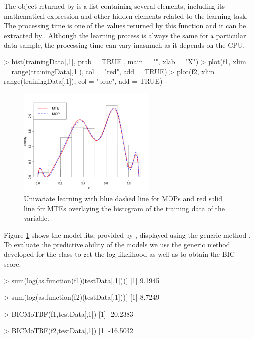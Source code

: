 The object returned by  is a list containing several elements, including its mathematical expression and other hidden elements related to the learning task.
The processing time is one of the values returned by this function and it can be extracted by . 
Although the learning process is always the same for a particular data sample, the processing time can vary inasmuch as it depends on the CPU.

\begin{example}
> hist(trainingData[,1], prob = TRUE , main = "", xlab = "X")
> plot(f1, xlim = range(trainingData[,1]), col = "red", add = TRUE)
> plot(f2, xlim = range(trainingData[,1]), col = "blue", add = TRUE)
\end{example}

\begin{figure}
	\centering

	\includegraphics[width=0.6\textwidth]{FIGS/univariate.png}

	\caption{Univariate learning with blue dashed line for MOPs and red solid line for MTEs overlaying the histogram of the training data of the  variable.}
	\label{fig:univariate}
\end{figure}

Figure \ref{fig:univariate} shows the model fits, provided by , displayed using the generic
method . \\

To evaluate the predictive ability of the models  we use the generic method  developed
for the  class to get the log-likelihood as well as  to obtain the BIC score.

\begin{example}
> sum(log(as.function(f1)(testData[,1])))
[1] 9.1945

> sum(log(as.function(f2)(testData[,1])))
[1] 8.7249

> BICMoTBF(f1,testData[,1])
[1] -20.2383

> BICMoTBF(f2,testData[,1])
[1] -16.5032
\end{example}


